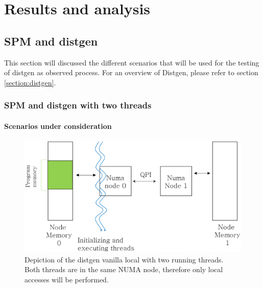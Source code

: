 \chapter{Results and analysis}\label{chapter:res-analysis}

\section{SPM and distgen}\label{section:spmydistgen}
This section will discussed the different scenarios that will be used for the testing of distgen as observed process. For an overview of Distgen, please refer to section \ref{section:distgen}.
\subsection{SPM and distgen with two threads}\label{subsection:res-spmydistgen-2t}

\subsubsection{Scenarios under consideration}\label{subsection:res-scenarios-2t-scens}

\begin{figure}[th]
	\centering
		\includegraphics[width=.8\textwidth]{figures/distgentt-local.eps}
		\caption[Depiction of the working of the distgen vanilla local scenario with two threads]{Depiction of the distgen vanilla local with two running threads. Both threads are in the same NUMA node, therefore only local accesses will be performed.}
		\label{fig:dgentt-local}
\end{figure}

